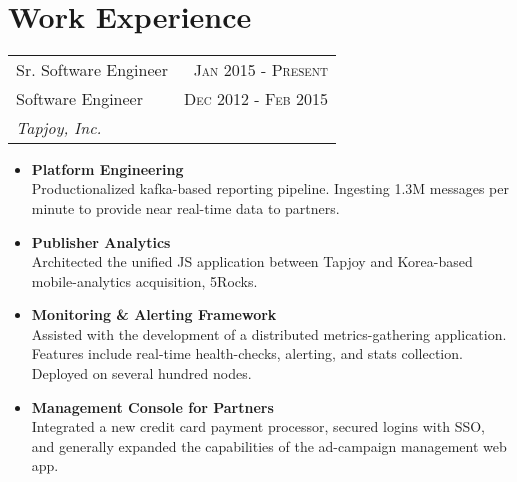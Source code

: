 \documentclass[10pt]{article} %
\begin{document}
\color{text1} %


\par{\\


\begin{minipage}[t]{0.5\textwidth}
\vspace{0pt} %


\section{Work Experience}


\begin{tabularx}{\linewidth}{ X r }
  {\large Sr. Software Engineer } & {\textsc{Jan 2015 - Present}} \\
  {\large Software Engineer } & {\textsc{Dec 2012 - Feb 2015}} \\
  {\small\textit{Tapjoy, Inc.}}
\end{tabularx}

\begin{itemize}
  \item \small\textbf{Platform Engineering} \\
    \small{Productionalized kafka-based reporting pipeline. Ingesting 1.3M messages per minute to provide near real-time data to partners.}
  \item \small\textbf{Publisher Analytics} \\
    \small{Architected the unified JS application between Tapjoy and Korea-based mobile-analytics acquisition, 5Rocks.}
  \item \small\textbf{Monitoring \& Alerting Framework} \\
    \small{Assisted with the development of a distributed metrics-gathering application. Features include real-time health-checks, alerting, and stats collection. Deployed on several hundred nodes.}
  \item \small\textbf{Management Console for Partners} \\
    \small{Integrated a new credit card payment processor, secured logins with SSO, and generally expanded the capabilities of the ad-campaign management web app.}


\end{itemize}
\end{minipage}}
\end{document}
